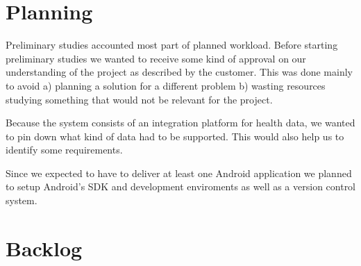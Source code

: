 \section{Planning}

Preliminary studies accounted most part of planned workload.
Before starting preliminary studies we wanted to receive some kind of approval on our
understanding of the project as described by the customer. This was done mainly to avoid
a) planning a solution for a different problem
b) wasting resources studying something that would not be relevant for the project.

Because the system consists of an integration platform for health data,
we wanted to pin down what kind of data had to be supported.
This would also help us to identify some requirements.

Since we expected to have to deliver at least one Android application
we planned to setup Android's SDK and development enviroments as well
as a version control system.

\section{Backlog}

